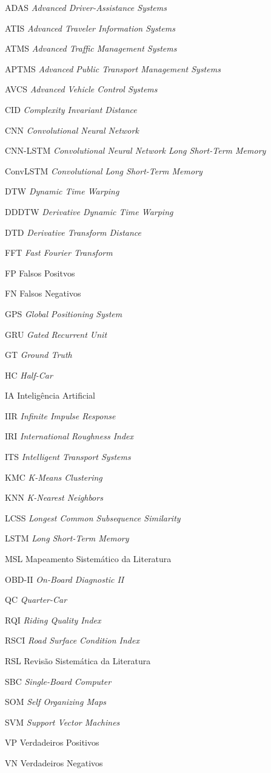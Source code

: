 \begin{siglas}
\item[ADAS] \textit{Advanced Driver-Assistance Systems}
\item[ATIS] \textit{Advanced Traveler Information Systems}
\item[ATMS] \textit{Advanced Traffic Management Systems}
\item[APTMS] \textit{Advanced Public Transport Management Systems}
\item[AVCS] \textit{Advanced Vehicle Control Systems}
\item[CID] \textit{Complexity Invariant Distance}
\item[CNN] \textit{Convolutional Neural Network}
\item[CNN-LSTM] \textit{Convolutional Neural Network Long Short-Term Memory}
\item[ConvLSTM] \textit{Convolutional Long Short-Term Memory}
\item[DTW] \textit{Dynamic Time Warping}
\item[DDDTW] \textit{Derivative Dynamic Time Warping}
\item[DTD] \textit{Derivative Transform Distance}
\item[FFT] \textit{Fast Fourier Transform}
\item[FP] Falsos Positvos
\item[FN] Falsos Negativos
\item[GPS] \textit{Global Positioning System}
\item[GRU] \textit{Gated Recurrent Unit}
\item[GT] \textit{Ground Truth}
\item[HC] \textit{Half-Car}
\item[IA] Inteligência  Artificial
\item[IIR] \textit{Infinite Impulse Response}
\item[IRI] \textit{International Roughness Index}
\item[ITS] \textit{Intelligent Transport Systems}
\item[KMC] \textit{K-Means Clustering}
\item[KNN] \textit{K-Nearest Neighbors}
\item[LCSS] \textit{Longest Common Subsequence Similarity}
\item[LSTM] \textit{Long Short-Term Memory}
\item[MSL] Mapeamento Sistemático da Literatura
\item[OBD-II] \textit{On-Board Diagnostic II}
\item[QC] \textit{Quarter-Car}
\item[RQI] \textit{Riding Quality Index}
\item[RSCI] \textit{Road Surface Condition Index}
\item[RSL] Revisão Sistemática da Literatura
\item[SBC] \textit{Single-Board  Computer}
\item[SOM] \textit{Self Organizing Maps}
\item[SVM] \textit{Support Vector Machines}
\item[VP] Verdadeiros Positivos
\item[VN] Verdadeiros Negativos
\end{siglas}
